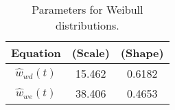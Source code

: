 \begin{table}\centering 
	\begin{tabular}{ccc}
	\hline
	\textbf{Equation} \boldmath{$\hat{w}_x(d)$} & \boldmath{$\gamma_x$} \textbf{(Scale)} & \boldmath{$k_x$} \textbf{(Shape)} \\
	\hline
	$\hat{w}_{wd}(t)$ & 15.462 & 0.6182 \\
	$\hat{w}_{we}(t)$ & 38.406 & 0.4653\\
	\hline
	\end{tabular}
	\caption{Parameters for Weibull distributions.}
	\label{ch4:tab:trip-distance-probailility}
\end{table}
